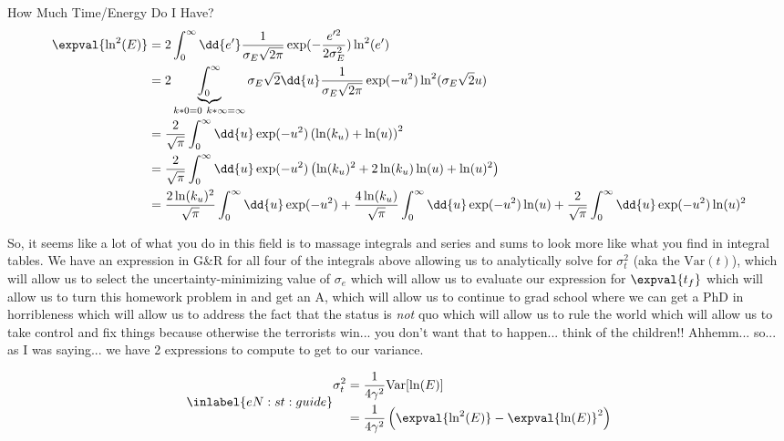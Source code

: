 \begin{answer}
\begin{answerpart}{How Much Time/Energy Do I Have?}
    \begin{equation}
      \begin{alignedat}{2}
        &&\expval{\ln^2(E)}
        &=
        2\int_0^\infty \dd{e'}
        \frac{1}{\sigma_E\sqrt{2\pi}}
        \exp(-\frac{e'^2}{2\sigma_E^2})
        \ln^2(e')
        \\
        &&&=
        2\underbrace{\int_0^\infty}_{k*0=0\ k*\infty=\infty}
        \sigma_E\sqrt{2}\dd{u}
        \frac{1}{\sigma_E\sqrt{2\pi}}
        \exp(-u^2)
        \ln^2(\sigma_E\sqrt{2}u)
        \\
        &&&=
        \frac{2}{\sqrt{\pi}}
        \int_0^\infty
        \dd{u}
        \exp(-u^2)
        \left(\ln(k_u) + \ln(u)\right)^2
        \\
        &&&=
        \frac{2}{\sqrt{\pi}}
        \int_0^\infty
        \dd{u}
        \exp(-u^2)
        \left(\ln(k_u)^2 + 2\ln(k_u)\ln(u) + \ln(u)^2\right)
        \\
        &&&=
        \frac{2\ln(k_u)^2}{\sqrt{\pi}}
        \int_0^\infty
        \dd{u}
        \exp(-u^2)
        +
        \frac{4\ln(k_u)}{\sqrt{\pi}}
        \int_0^\infty
        \dd{u}
        \exp(-u^2)
        \ln(u)
        +
        \frac{2}{\sqrt{\pi}}
        \int_0^\infty
        \dd{u}
        \exp(-u^2)
        \ln(u)^2
        \\
      \end{alignedat}
    \end{equation}

    So, it seems like a lot of what you do in this field is to massage
    integrals and series and sums to look more like what you find in
    integral tables.  We have an expression in G\&R for all four of
    the integrals above allowing us to analytically solve for
    $\sigma_t^2$ (aka the $\mathrm{Var}(t)$), which will allow us to
    select the uncertainty-minimizing value of $\sigma_e$ which will
    allow us to evaluate our expression for $\expval{t_f}$ which will
    allow us to turn this homework problem in and get an A, which will
    allow us to continue to grad school where we can get a PhD in
    horribleness which will allow us to address the fact that the
    status is \emph{not} quo which will allow us to rule the world
    which will allow us to take control and fix things because
    otherwise the terrorists win... you don't want that to
    happen... think of the children!!  Ahhemm... so... as I was
    saying... we have 2 expressions to compute to get to our variance.

    \begin{equation}
      \inlabel{eN:st:guide}
      \begin{alignedat}{2}
        &&\sigma_t^2
        &= \frac{1}{4\gamma^2} \mathrm{Var}[\ln(E)]\\
        &&&= \frac{1}{4\gamma^2}
        \left(
        \expval{\ln^2(E)} - \expval{\ln(E)}^2
        \right)
        \\
      \end{alignedat}
    \end{equation}


\end{answerpart}
\end{answer}
